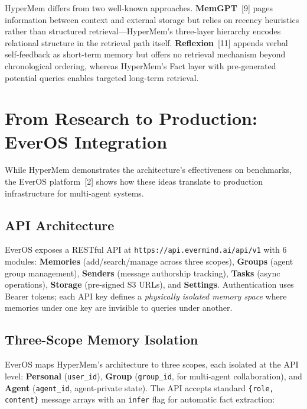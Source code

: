 \documentclass[11pt, a4paper]{article}
\begin{document}
HyperMem differs from two well-known approaches. \textbf{MemGPT}~[9] pages information between context and external storage but relies on recency heuristics rather than structured retrieval---HyperMem's three-layer hierarchy encodes relational structure in the retrieval path itself. \textbf{Reflexion}~[11] appends verbal self-feedback as short-term memory but offers no retrieval mechanism beyond chronological ordering, whereas HyperMem's Fact layer with pre-generated potential queries enables targeted long-term retrieval.

\section{From Research to Production: EverOS Integration}

While HyperMem demonstrates the architecture's effectiveness on benchmarks, the EverOS platform~[2] shows how these ideas translate to production infrastructure for multi-agent systems.

\subsection{API Architecture}

EverOS exposes a RESTful API at \texttt{https://api.evermind.ai/api/v1} with 6 modules: \textbf{Memories} (add/search/manage across three scopes), \textbf{Groups} (agent group management), \textbf{Senders} (message authorship tracking), \textbf{Tasks} (async operations), \textbf{Storage} (pre-signed S3 URLs), and \textbf{Settings}. Authentication uses Bearer tokens; each API key defines a \emph{physically isolated memory space} where memories under one key are invisible to queries under another.

\subsection{Three-Scope Memory Isolation}

EverOS maps HyperMem's architecture to three scopes, each isolated at the API level: \textbf{Personal} (\texttt{user\_id}), \textbf{Group} (\texttt{group\_id}, for multi-agent collaboration), and \textbf{Agent} (\texttt{agent\_id}, agent-private state). The API accepts standard \texttt{\{role, content\}} message arrays with an \texttt{infer} flag for automatic fact extraction:
\end{document}
